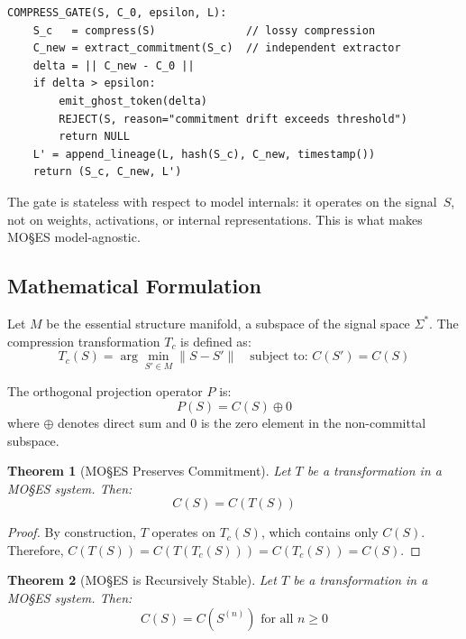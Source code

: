 \documentclass[11pt,a4paper]{article}
\newtheorem{theorem}{Theorem}[section]
\begin{document}
\begin{verbatim}
COMPRESS_GATE(S, C_0, epsilon, L):
    S_c   = compress(S)              // lossy compression
    C_new = extract_commitment(S_c)  // independent extractor
    delta = || C_new - C_0 ||
    if delta > epsilon:
        emit_ghost_token(delta)
        REJECT(S, reason="commitment drift exceeds threshold")
        return NULL
    L' = append_lineage(L, hash(S_c), C_new, timestamp())
    return (S_c, C_new, L')
\end{verbatim}

\noindent The gate is stateless with respect to model internals: it operates on the signal~$S$, not on weights, activations, or internal representations. This is what makes MO\S{}ES\texttrademark{} model-agnostic.

\subsection{Mathematical Formulation}
Let $M$ be the essential structure manifold, a subspace of the signal space $\Sigma^*$. The compression transformation $T_c$ is defined as:
\begin{equation}
T_c(S) = \arg\min_{S' \in M} \|S - S'\| \quad \text{subject to: } C(S') = C(S)
\end{equation}

The orthogonal projection operator $P$ is:
\begin{equation}
P(S) = C(S) \oplus 0
\end{equation}
where $\oplus$ denotes direct sum and $0$ is the zero element in the non-committal subspace.

\begin{theorem}[MO\S{}ES\texttrademark{} Preserves Commitment]
\label{thm:moses-preserve}
Let $T$ be a transformation in a MO\S{}ES\texttrademark{} system. Then:
\begin{equation}
C(S) = C(T(S))
\end{equation}
\end{theorem}

\begin{proof}
By construction, $T$ operates on $T_c(S)$, which contains only $C(S)$. Therefore, $C(T(S)) = C(T(T_c(S))) = C(T_c(S)) = C(S)$.
\end{proof}

\begin{theorem}[MO\S{}ES\texttrademark{} is Recursively Stable]
\label{thm:moses-stable}
Let $T$ be a transformation in a MO\S{}ES\texttrademark{} system. Then:
\begin{equation}
C(S) = C(S^{(n)}) \text{ for all } n \geq 0
\end{equation}
\end{theorem}
\end{document}
